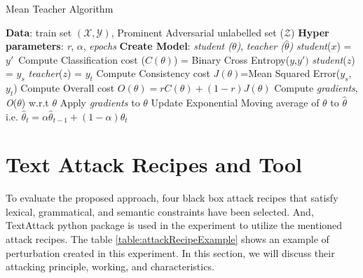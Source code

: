 \documentclass[%
	BCOR=8mm, %
	DIV=12,
	toc=bibliography, %
	toc=listof, %
	oneside, %
	egregdoesnotlikesansseriftitles, %
	]{scrbook}
\begin{document}
\begin{algorithm}[H]
    \caption{Mean Teacher Algorithm} \label{alg:MeanTeacher}
    \begin{algorithmic}
        \STATE \textbf{Data}: train set $\mathcal{(X,Y)}$,  Prominent Adversarial unlabelled set ($\mathcal{Z}$)
        \STATE \textbf{Hyper parameters}: \emph{r}, \emph{$\alpha$}, \emph{epochs}
        \STATE \textbf{Create Model}: \emph{student ($\theta$)}, \emph{teacher ($\hat\theta$)} 
        \STATE  \emph{student}($x$) = $y'$\
        \STATE Compute Classification cost ($C(\theta)$) = Binary Cross Entropy($y$,$y')$
        \STATE  \emph{student}($z$) = $y_s$
        \STATE  \emph{teacher}($z$) = $y_t$
        \STATE Compute Consistency cost $J(\theta)$=Mean Squared Error($y_s$,$y_{t}$)
        \STATE Compute Overall cost  $\textit{O}(\theta)= r C(\theta)+(1-r)J(\theta)$
        \STATE Compute \emph{gradients}, \textit{O}($\theta$) w.r.t  $\theta$ 
        \STATE Apply \emph{gradients} to $\theta$
        \STATE Update Exponential Moving average of $\theta$ to $\hat\theta$ i.e. $\hat\theta_t= \alpha\hat\theta_{t-1}+(1-\alpha)\theta_t$\
        \ENDWHILE
        \ENDFOR
    \end{algorithmic}
\end{algorithm}

\section{Text Attack Recipes and Tool}
\label{section:attackrecipes}
To evaluate the proposed approach, four black box attack recipes that satisfy lexical, grammatical, and semantic constraints have been selected. And,  TextAttack python package \cite{morris_textattack_2020} is used in the experiment to utilize the mentioned attack recipes. The table \ref{table:attackRecipeExample} shows an example of perturbation created in this experiment. In this section, we will discuss their attacking principle, working, and characteristics.
\end{document}
